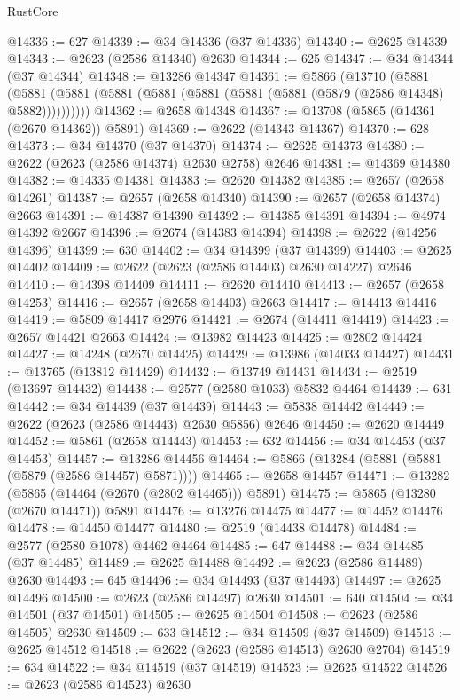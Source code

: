 \begin{lexlean}{RustCore}
\begin{coremodule}
@14336 := 627
@14339 := @34 @14336 (@37 @14336)
@14340 := @2625 @14339
@14343 := @2623 (@2586 @14340) @2630
@14344 := 625
@14347 := @34 @14344 (@37 @14344)
@14348 := @13286 @14347
@14361 := @5866
    (@13710
      (@5881 (@5881 (@5881 (@5881 (@5881 (@5881 (@5881 (@5881 (@5879 (@2586 @14348) @5882))))))))))
@14362 := @2658 @14348
@14367 := @13708 (@5865 (@14361 (@2670 @14362)) @5891)
@14369 := @2622 (@14343 @14367)
@14370 := 628
@14373 := @34 @14370 (@37 @14370)
@14374 := @2625 @14373
@14380 := @2622 (@2623 (@2586 @14374) @2630 @2758) @2646
@14381 := @14369 @14380
@14382 := @14335 @14381
@14383 := @2620 @14382
@14385 := @2657 (@2658 @14261)
@14387 := @2657 (@2658 @14340)
@14390 := @2657 (@2658 @14374) @2663
@14391 := @14387 @14390
@14392 := @14385 @14391
@14394 := @4974 @14392 @2667
@14396 := @2674 (@14383 @14394)
@14398 := @2622 (@14256 @14396)
@14399 := 630
@14402 := @34 @14399 (@37 @14399)
@14403 := @2625 @14402
@14409 := @2622 (@2623 (@2586 @14403) @2630 @14227) @2646
@14410 := @14398 @14409
@14411 := @2620 @14410
@14413 := @2657 (@2658 @14253)
@14416 := @2657 (@2658 @14403) @2663
@14417 := @14413 @14416
@14419 := @5809 @14417 @2976
@14421 := @2674 (@14411 @14419)
@14423 := @2657 @14421 @2663
@14424 := @13982 @14423
@14425 := @2802 @14424
@14427 := @14248 (@2670 @14425)
@14429 := @13986 (@14033 @14427)
@14431 := @13765 (@13812 @14429)
@14432 := @13749 @14431
@14434 := @2519 (@13697 @14432)
@14438 := @2577 (@2580 @1033) @5832 @4464
@14439 := 631
@14442 := @34 @14439 (@37 @14439)
@14443 := @5838 @14442
@14449 := @2622 (@2623 (@2586 @14443) @2630 @5856) @2646
@14450 := @2620 @14449
@14452 := @5861 (@2658 @14443)
@14453 := 632
@14456 := @34 @14453 (@37 @14453)
@14457 := @13286 @14456
@14464 := @5866 (@13284 (@5881 (@5881 (@5879 (@2586 @14457) @5871))))
@14465 := @2658 @14457
@14471 := @13282 (@5865 (@14464 (@2670 (@2802 @14465))) @5891)
@14475 := @5865 (@13280 (@2670 @14471)) @5891
@14476 := @13276 @14475
@14477 := @14452 @14476
@14478 := @14450 @14477
@14480 := @2519 (@14438 @14478)
@14484 := @2577 (@2580 @1078) @4462 @4464
@14485 := 647
@14488 := @34 @14485 (@37 @14485)
@14489 := @2625 @14488
@14492 := @2623 (@2586 @14489) @2630
@14493 := 645
@14496 := @34 @14493 (@37 @14493)
@14497 := @2625 @14496
@14500 := @2623 (@2586 @14497) @2630
@14501 := 640
@14504 := @34 @14501 (@37 @14501)
@14505 := @2625 @14504
@14508 := @2623 (@2586 @14505) @2630
@14509 := 633
@14512 := @34 @14509 (@37 @14509)
@14513 := @2625 @14512
@14518 := @2622 (@2623 (@2586 @14513) @2630 @2704)
@14519 := 634
@14522 := @34 @14519 (@37 @14519)
@14523 := @2625 @14522
@14526 := @2623 (@2586 @14523) @2630

\end{coremodule}
\end{lexlean}
